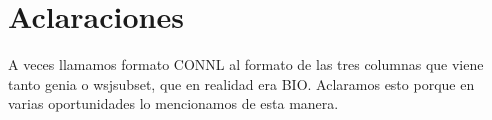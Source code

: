 \section{Aclaraciones}

A veces llamamos formato CONNL al formato de las tres columnas que viene tanto genia o wsjsubset, que en realidad era BIO. Aclaramos esto porque en varias oportunidades lo mencionamos de esta manera.
